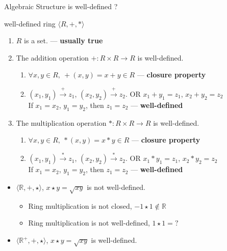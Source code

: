 \documentclass{beamer}
\begin{document}
\begin{frame}{Algebraic Structure is well-defined ?}
\begin{block}{well-defined ring $\langle R,+,\ast \rangle$}
	\begin{enumerate}
		\item<+-> $R$ is a set. --- \textbf{usually true}
		\item<+-> The addition operation $+ : R \times R \to R$ is well-defined.
		\begin{enumerate}
			\item<+-> $\forall x,y \in R,\ +(x,y) = x + y \in R$ --- \textbf{closure property}
			\item<+-> {$(x_1,y_1) \xrightarrow{+} z_1$, $(x_2,y_2) \xrightarrow{+} z_2$. OR $x_1 + y_1 = z_1$, $x_2 + y_2 = z_2$\\
				If $x_1 = x_2$, $y_1 = y_2$, then $z_1 = z_2$} --- \textbf{well-defined} 
		\end{enumerate}
		\item<+-> The multiplication operation $\ast : R \times R \to R$ is well-defined.
		\begin{enumerate}
			\item<+-> $\forall x,y \in R,\ \ast(x,y) = x \ast y \in R$ --- \textbf{closure property}
			\item<+-> {$(x_1,y_1) \xrightarrow{\ast} z_1$, $(x_2,y_2) \xrightarrow{\ast} z_2$. OR $x_1 \ast y_1 = z_1$, $x_2 \ast y_2 = z_2$\\
			If $x_1 = x_2$, $y_1 = y_2$, then $z_1 = z_2$} --- \textbf{well-defined} 
		\end{enumerate}
	\end{enumerate}
	\begin{itemize}
		\item<+-> $\langle \mathbb{R},+,\star \rangle$, $x \star y = \sqrt{xy}$ is not well-defined.
		\begin{itemize}
			\item<+-> Ring multiplication is not closed, $-1 \star 1 \notin \mathbb{R}$\\
			\item<+-> Ring multiplication is not well-defined, $1 \star 1 = ?$
		\end{itemize}
		\item<+-> $\langle \mathbb{R}^+,+,\star \rangle$, $x \star y = \sqrt{xy}$ is well-defined. 
	\end{itemize}
\end{block}
\end{frame}
\end{document}
